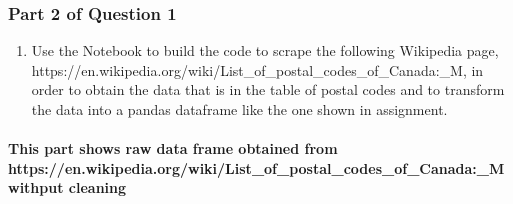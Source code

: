 \documentclass[11pt]{article}
\providecommand{\tightlist}{%
      \setlength{\itemsep}{0pt}\setlength{\parskip}{0pt}}
\begin{document}
    \hypertarget{part-2-of-question-1}{%
\subsubsection{Part 2 of Question 1}\label{part-2-of-question-1}}

\begin{enumerate}
\def\labelenumi{\arabic{enumi}.}
\setcounter{enumi}{1}
\tightlist
\item
  Use the Notebook to build the code to scrape the following Wikipedia
  page,
  https://en.wikipedia.org/wiki/List\_of\_postal\_codes\_of\_Canada:\_M,
  in order to obtain the data that is in the table of postal codes and
  to transform the data into a pandas dataframe like the one shown in
  assignment.
\end{enumerate}

    \hypertarget{this-part-shows-raw-data-frame-obtained-from-httpsen.wikipedia.orgwikilist_of_postal_codes_of_canada_m-withput-cleaning}{%
\paragraph{This part shows raw data frame obtained from
https://en.wikipedia.org/wiki/List\_of\_postal\_codes\_of\_Canada:\_M
withput
cleaning}\label{this-part-shows-raw-data-frame-obtained-from-httpsen.wikipedia.orgwikilist_of_postal_codes_of_canada_m-withput-cleaning}}
\end{document}
